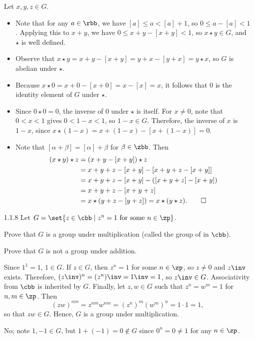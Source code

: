 \begin{sol}
    Let $x, y, z \in G$.
    \begin{itemize}
        \item Note that for any $a \in \rbb$, we have $[a] \leq a < [a] + 1$, so $0 \leq a - [a] < 1$.
        Applying this to $x + y$, we have $0 \leq x + y - [x + y] < 1$, so $x \star y \in G$, and $\star$ is well defined.
        \item Observe that $x \star y = x + y - [x + y] = y + x - [y + x] = y \star x$, so $G$ is abelian under $\star$.
        \item Because $x \star 0 = x + 0 - [x + 0] = x - [x] = x$, it follows that $0$ is the identity element of $G$ under $\star$.
        \item Since $0 \star 0 = 0$, the inverse of $0$ under $\star$ is itself.
	    For $x \neq 0$, note that $0 < x < 1$ gives $0 < 1 - x < 1$, so $1 - x \in G$.
        Therefore, the inverse of $x$ is $1 - x$, since $x \star (1 - x) = x + (1 - x) - [x + (1 - x)] = 0$.
        \item Note that $[\alpha + \beta] = [\alpha] + \beta$ for $\beta \in \zbb$.
	    Then
        \begin{align*}
            (x \star y) \star z & = (x + y - [x + y]) \star z \\
            & = x + y + z - [x + y] - [x + y + z - [x + y]] \\
            & = x + y + z - [x + y] - ([x + y + z] - [x + y]) \\
            & = x + y + z - [x + y + z] \\
            & = x \star (y + z - [y + z]) = x \star (y \star z). \qedhere
        \end{align*}
    \end{itemize}
\end{sol}

\begin{exercise}{1.1.8}
    Let $G = \set{z \in \cbb\mid z^n = 1 \text{ for some } n \in \zp }$.
    \begin{subexercises}
        \item Prove that $G$ is a group under multiplication (called the group of  in $\cbb$).
        \item Prove that $G$ is not a group under addition.
    \end{subexercises}
\end{exercise}

\begin{solenum}
    \item Since $1^1 = 1$, $1 \in G$.
	If $z \in G$, then $z^n = 1$ for some $n \in \zp$, so $z \neq 0$ and $z\inv$ exists.
    Therefore, $(z\inv)^n = (z^n)\inv = 1\inv = 1$, so $z\inv \in G$.
	Associativity from $\cbb$ is inherited by $G$.
	Finally, let $z, w \in G$ such that $z^n = w^m = 1$ for $n, m \in \zp$.
	Then
    \[
    	(zw)^{nm} = z^{nm} w^{nm} = (z^n)^m (w^m)^n = 1 \cdot 1 = 1,
    \]
    so that $zw \in G$.
	Hence, $G$ is a group under multiplication.
    \item No; note $1, -1 \in G$, but $1 + (-1) = 0 \notin G$ since $0^n = 0 \neq 1$ for any $n \in \zp$.
\end{solenum}

